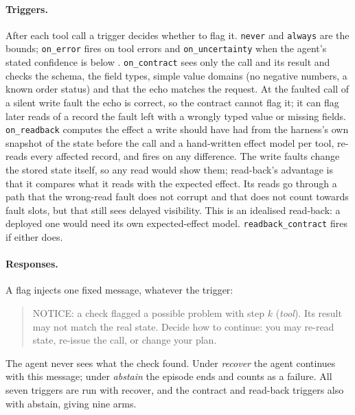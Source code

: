 \paragraph{Triggers.} After each tool call a trigger decides whether to flag it. \texttt{never} and
\texttt{always} are the bounds; \texttt{on\_error} fires on tool errors and \texttt{on\_uncertainty}
when the agent's stated confidence is below \RQwenEightThreshold{}. \texttt{on\_contract} sees only
the call and its result and checks the schema, the field types, simple value domains (no negative numbers, a known order
status) and that the echo matches the request.
At the faulted call of a silent write fault the echo is correct, so the contract cannot flag it; it can
flag later reads of a record the fault left with a wrongly typed value or missing fields.
\texttt{on\_readback} computes the effect a write should have had from the harness's own snapshot of
the state before the call and a hand-written effect model per tool, re-reads every affected record, and
fires on any difference. The write faults change the stored state itself, so any read would show them;
read-back's advantage is that it compares what it reads with the expected effect. Its reads go through
a path that the wrong-read fault does not corrupt and that does not count towards fault slots, but
that still sees delayed visibility. This is an idealised read-back: a deployed one would need its own
expected-effect model. \texttt{readback\_contract} fires if either does.

\paragraph{Responses.} A flag injects one fixed message, whatever the trigger:
\begin{quote}\small
NOTICE\@: a check flagged a possible problem with step $k$ (\emph{tool}). Its result may not match the
real state. Decide how to continue: you may re-read state, re-issue the call, or change your plan.
\end{quote}
The agent never sees what the check found. Under \emph{recover} the agent continues with this
message; under \emph{abstain} the episode ends and counts as a failure. All seven triggers are run with
recover, and the contract and read-back triggers also with abstain, giving nine arms.
